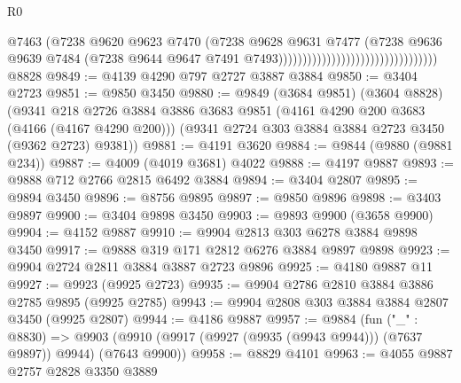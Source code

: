 \begin{lexlean}{R0}
\begin{coremodule}
                                                              @7463
                                                              (@7238
                                                                @9620
                                                                @9623
                                                                @7470
                                                                (@7238
                                                                  @9628
                                                                  @9631
                                                                  @7477
                                                                  (@7238
                                                                    @9636
                                                                    @9639
                                                                    @7484
                                                                    (@7238
                                                                      @9644
                                                                      @9647
                                                                      @7491
                                                                      @7493)))))))))))))))))))))))))))))))))
    @8828
@9849 := @4139 @4290 @797 @2727 @3887 @3884
@9850 := @3404 @2723
@9851 := @9850 @3450
@9880 := @9849
    (@3684 @9851)
    (@3604 @8828)
    (@9341
      @218
      @2726
      @3884
      @3886
      @3683
      @9851
      (@4161 @4290 @200 @3683 (@4166 (@4167 @4290 @200)))
      (@9341 @2724 @303 @3884 @3884 @2723 @3450 (@9362 @2723) @9381))
@9881 := @4191 @3620
@9884 := @9844 (@9880 (@9881 @234))
@9887 := @4009 (@4019 @3681) @4022
@9888 := @4197 @9887
@9893 := @9888 @712 @2766 @2815 @6492 @3884
@9894 := @3404 @2807
@9895 := @9894 @3450
@9896 := @8756 @9895
@9897 := @9850 @9896
@9898 := @3403 @9897
@9900 := @3404 @9898 @3450
@9903 := @9893 @9900 (@3658 @9900)
@9904 := @4152 @9887
@9910 := @9904 @2813 @303 @6278 @3884 @9898 @3450
@9917 := @9888 @319 @171 @2812 @6276 @3884 @9897 @9898
@9923 := @9904 @2724 @2811 @3884 @3887 @2723 @9896
@9925 := @4180 @9887 @11
@9927 := @9923 (@9925 @2723)
@9935 := @9904 @2786 @2810 @3884 @3886 @2785 @9895 (@9925 @2785)
@9943 := @9904 @2808 @303 @3884 @3884 @2807 @3450 (@9925 @2807)
@9944 := @4186 @9887
@9957 := @9884
    (fun ("_" : @8830) =>
    @9903 (@9910 (@9917 (@9927 (@9935 (@9943 @9944))) (@7637 @9897)) @9944) (@7643 @9900))
@9958 := @8829 @4101
@9963 := @4055 @9887 @2757 @2828 @3350 @3889

\end{coremodule}
\end{lexlean}
